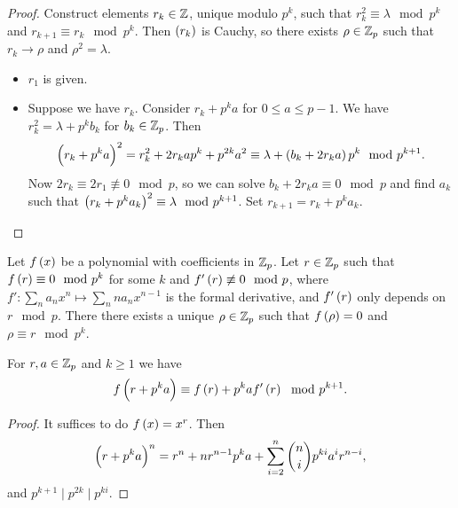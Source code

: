 \begin{proof}
Construct elements $ r_k \in \mathbb{Z} $, unique modulo $ p^k $, such that $ r_k^2 \equiv \lambda \mod p^k $ and $ r_{k + 1} \equiv r_k \mod p^k $. Then $ \br{r_k} $ is Cauchy, so there exists $ \rho \in \mathbb{Z}_p $ such that $ r_k \to \rho $ and $ \rho^2 = \lambda $.
\begin{itemize}
\item $ r_1 $ is given.
\item Suppose we have $ r_k $. Consider $ r_k + p^ka $ for $ 0 \le a \le p - 1 $. We have $ r_k^2 = \lambda + p^kb_k $ for $ b_k \in \mathbb{Z}_p $. Then
$$ \br{r_k + p^ka}^2 = r_k^2 + 2r_kap^k + p^{2k}a^2 \equiv \lambda + \br{b_k + 2r_ka}p^k \mod p^{k + 1}. $$
Now $ 2r_k \equiv 2r_1 \not\equiv 0 \mod p $, so we can solve $ b_k + 2r_ka \equiv 0 \mod p $ and find $ a_k $ such that $ \br{r_k + p^ka_k}^2 \equiv \lambda \mod p^{k + 1} $. Set $ r_{k + 1} = r_k + p^ka_k $.
\end{itemize}
\end{proof}

\begin{proposition}
\label{prop:4.4.7}
Let $ f\br{x} $ be a polynomial with coefficients in $ \mathbb{Z}_p $. Let $ r \in \mathbb{Z}_p $ such that $ f\br{r} \equiv 0 \mod p^k $ for some $ k $ and $ f'\br{r} \not\equiv 0 \mod p $, where $ f' : \sum_n a_nx^n \mapsto \sum_n na_nx^{n - 1} $ is the formal derivative, and $ f'\br{r} $ only depends on $ r \mod p $. There there exists a unique $ \rho \in \mathbb{Z}_p $ such that $ f\br{\rho} = 0 $ and $ \rho \equiv r \mod p^k $.
\end{proposition}

\begin{lemma}
For $ r, a \in \mathbb{Z}_p $ and $ k \ge 1 $ we have
$$ f\br{r + p^ka} \equiv f\br{r} + p^kaf'\br{r} \mod p^{k + 1}. $$
\end{lemma}

\begin{proof}
It suffices to do $ f\br{x} = x^r $. Then
$$ \br{r + p^ka}^n = r^n + nr^{n - 1}p^ka + \sum_{i = 2}^n \binom{n}{i}p^{ki}a^ir^{n - i}, $$
and $ p^{k + 1} \mid p^{2k} \mid p^{ki} $.
\end{proof}


